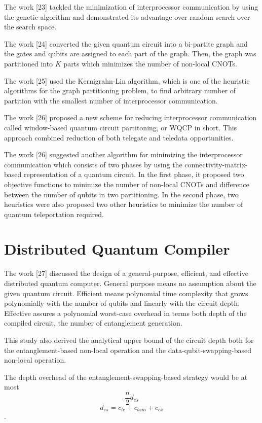 The work [23] tackled the minimization of interprocessor communication by using the genetic algorithm and demonstrated its advantage over random search over the search space.

The work [24] converted the given quantum circuit into a bi-partite graph and the gates and qubits are assigned to each part of the graph.  Then, the graph was partitioned into $K$ parts which minimizes the number of non-local CNOTs.

The work [25] used the Kernigrahn-Lin algorithm, which is one of the heuristic algorithms for the graph partitioning problem, to find arbitrary number of partition with the smallest number of interprocessor communication.

The work [26] proposed a new scheme for reducing interprocessor communication called window-based quantum circuit partitoning, or WQCP in short.  This approach combined reduction of both telegate and teledata opportunities. 

The work [26] suggested another algorithm for minimizing the interprocessor communication which consists of two phases by using the connectivity-matrix-based representation of a quantum circuit.
In the first phase, it proposed two objective functions to minimize the number of non-local CNOTs and difference between the number of qubits in two partitioning.  In the second phase, two heuristics were also proposed two other heuristics to minimize the number of quantum teleportation required.

\section{Distributed Quantum Compiler}

The work [27] discussed the design of a general-purpose, efficient, and effective distributed quantum computer. General purpose means no assumption about the given quantum circuit. Efficient means polynomial time complexity that grows polynomially with the number of qubits and linearly with the circuit depth.  Effective assures a polynomial worst-case overhead in terms both depth of the compiled circuit, the number of entanglement generation.

 This study also derived the analytical upper bound of the circuit depth both for the entanglement-based non-local operation and the data-qubit-swapping-based non-local operation.
 
 The depth overhead of the entanglement-swapping-based strategy would be at most 
 $$\frac{n}{2}d_{es}$$
 $$d_{es} = c_{le} + c_{bsm} + c_{cx}$$. 
 
